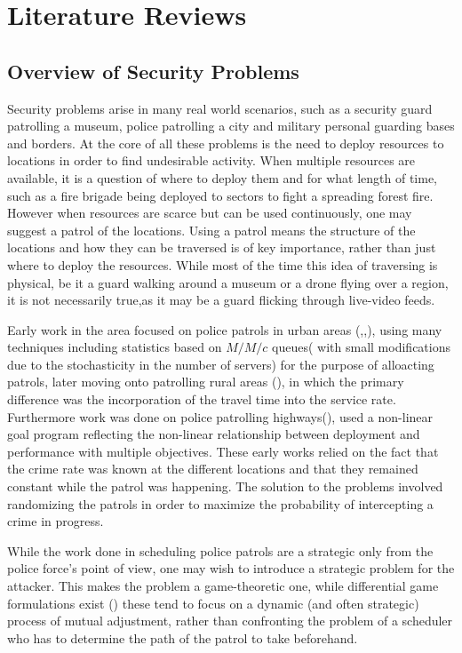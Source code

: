 \documentclass[a4paper,10pt]{article}
\theoremstyle{definition}
\theoremstyle{definition}
\theoremstyle{remark}
\theoremstyle{definition}
\begin{document}
\setlength{\parindent}{0pt}
\setlength{\parskip}{1em}

\newpage
{}

\section{Literature Reviews}
\label{Section:Literature Reviews}
\subsection{Overview of Security Problems}
Security problems arise in many real world scenarios, such as a security guard patrolling a museum, police patrolling a city and military personal guarding bases and borders. At the core of all these problems is the need to deploy resources to locations in order to find undesirable activity. When multiple resources are available, it is a question of where to deploy them and for what length of time, such as a fire brigade being deployed to sectors to fight a spreading forest fire. However when resources are scarce but can be used continuously, one may suggest a patrol of the locations. Using a patrol means the structure of the locations and how they can be traversed is of key importance, rather than just where to deploy the resources. While most of the time this idea of traversing is physical, be it a guard walking around a museum or a drone flying over a region, it is not necessarily true,as it may be a guard flicking through live-video feeds.

Early work in the area focused on police patrols in urban areas (\cite{Larson1972},\cite{Chelst1978},\cite{Chaiken1978}), using many techniques including statistics based on $M/M/c$ queues( with small modifications due to the stochasticity in the number of servers) for the purpose of alloacting patrols, later moving onto patrolling rural areas (\cite{Birge1989}), in which the primary difference was the incorporation of the travel time into the service rate. Furthermore work was done on police patrolling highways(\cite{Taylor1985}), used a non-linear goal program reflecting the non-linear relationship between deployment and performance with multiple objectives. These early works relied on the fact that the crime rate was known at the different locations and that they remained constant while the patrol was happening. The solution to the problems involved randomizing the patrols in order to maximize the probability of intercepting a crime in progress.

While the work done in scheduling police patrols are a strategic only from the police force's point of view, one may wish to introduce a strategic problem for the attacker. This makes the problem a game-theoretic one, while differential game formulations exist (\cite{Feichtinger1983}) these tend to focus on a dynamic (and often strategic) process of mutual adjustment, rather than confronting the problem of a scheduler who has to determine the path of the patrol to take beforehand.
\end{document}
